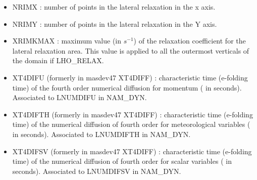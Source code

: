 \begin{itemize}
\item
{}
NRIMX : number of points  in the lateral relaxation  in the x axis. 

\item
{}
NRIMY : number of points in the lateral relaxation  in the Y axis.
\item
{}
XRIMKMAX : maximum value (in $s^{-1}$)  of the relaxation coefficient
for the lateral relaxation area. This value is applied to all the
outermost verticals of the domain if LHO\_RELAX. 

\item
{}
XT4DIFU (formerly in masdev47 XT4DIFF) : characteristic time (e-folding time)  
of the fourth order numerical diffusion for momentum ( in seconds). Associated to LNUMDIFU in NAM\_DYN.

\item
{}
XT4DIFTH (formerly in masdev47 XT4DIFF) : characteristic time (e-folding time)  of the numerical diffusion
of fourth order for meteorological variables ( in seconds). Associated to LNUMDIFTH in NAM\_DYN.

\item
{}
XT4DIFSV (formerly in masdev47 XT4DIFF) : characteristic time (e-folding time)  of the numerical diffusion
of fourth order for scalar variables ( in seconds). Associated to LNUMDIFSV in NAM\_DYN.

\end{itemize}

